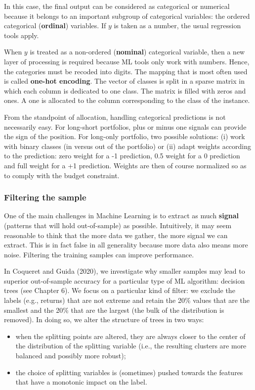 In this case, the final output can be considered as categorical or numerical because it belongs to an important subgroup of categorical variables: the ordered categorical (\textbf{ordinal}) variables. If $y$ is taken as a number, the usual regression tools apply.

When $y$ is treated as a non-ordered (\textbf{nominal}) categorical variable, then a new layer of processing is required because ML tools only work with numbers. Hence, the categories must be recoded into digits. The mapping that is most often used is called \textbf{one-hot encoding}. The vector of classes is split in a sparse matrix in which each column is dedicated to one class. The matrix is filled with zeros and ones. A one is allocated to the column corresponding to the class of the instance.

From the standpoint of allocation, handling categorical predictions is not necessarily easy. For long-short portfolios, plus or minus one signals can provide the sign of the position. For long-only portfolio, two possible solutions: (i) work with binary classes (in versus out of the portfolio) or (ii) adapt weights according to the prediction: zero weight for a -1 prediction, 0.5 weight for a 0 prediction and full weight for a +1 prediction. Weights are then of course normalized so as to comply with the budget constraint.

\subsubsection{Filtering the sample}
One of the main challenges in Machine Learning is to extract as much \textbf{signal} (patterns that will hold out-of-sample) as possible. Intuitively, it may seem reasonable to think that the more data we gather, the more signal we can extract. This is in fact false in all generality because more data also means more noise. Filtering the training samples can improve performance.

In Coqueret and Guida (2020), we investigate why smaller samples may lead to superior out-of-sample accuracy for a particular type of ML algorithm: decision trees (see Chapter 6). We focus on a particular kind of filter: we exclude the labels (e.g., returns) that are not extreme and retain the 20\% values that are the smallest and the 20\% that are the largest (the bulk of the distribution is removed). In doing so, we alter the structure of trees in two ways:
\begin{itemize}
    \item when the splitting points are altered, they are always closer to the center of the distribution of the splitting variable (i.e., the resulting clusters are more balanced and possibly more robust);
    \item the choice of splitting variables is (sometimes) pushed towards the features that have a monotonic impact on the label.
\end{itemize}

